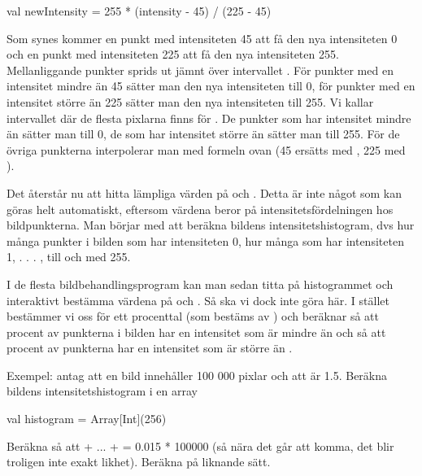 \begin{Code}
val newIntensity = 255 * (intensity - 45) / (225 - 45)
\end{Code}

Som synes kommer en punkt med intensiteten 45 att få den nya intensiteten 0 och en punkt med intensiteten 225 att få den nya intensiteten 255. Mellanliggande punkter sprids ut jämnt över intervallet \code{[0, 255]}. För punkter med en intensitet mindre än 45 sätter man den nya intensiteten till 0, för punkter med en intensitet större än 225 sätter man den nya intensiteten till 255. Vi kallar intervallet där de flesta pixlarna finns för . De punkter som har intensitet mindre än  sätter man till 0, de som har intensitet större än  sätter man till 255. För de övriga punkterna interpolerar man med formeln ovan (45 ersätts med , 225 med ).

Det återstår nu att hitta lämpliga värden på  och . Detta är inte något som kan göras helt automatiskt, eftersom värdena beror på intensitetsfördelningen hos bildpunkterna. Man börjar med att beräkna bildens intensitetshistogram, dvs hur många punkter i bilden som har intensiteten 0, hur många som har intensiteten 1, . . . , till och med 255.

I de flesta bildbehandlingsprogram kan man sedan titta på histogrammet och interaktivt bestämma värdena på  och . Så ska vi dock inte göra här. I stället bestämmer vi oss för ett procenttal  (som bestäms av ) och beräknar  så att  procent av punkterna i bilden har en intensitet som är mindre än  och  så att  procent av punkterna har en intensitet som är större än .

Exempel: antag att en bild innehåller 100 000 pixlar och att  är 1.5. Beräkna bildens intensitetshistogram i en array
\begin{Code} 
val histogram = Array[Int](256)
\end{Code}

Beräkna  så att  + ... +  = 0.015 * 100000 (så nära det går att komma, det blir troligen inte exakt likhet). Beräkna  på liknande sätt.

